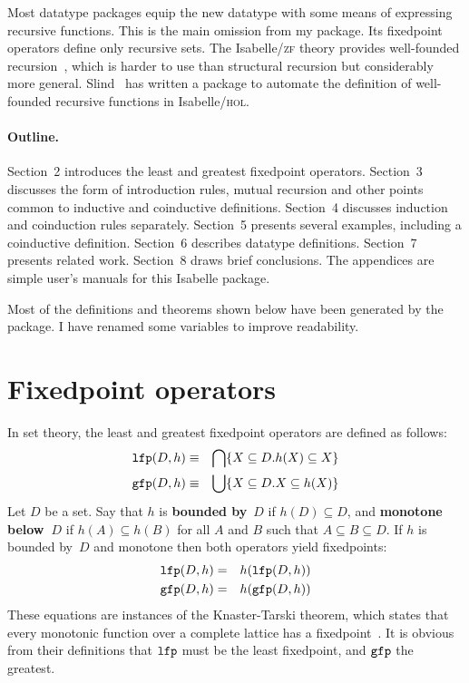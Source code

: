 \documentclass[12pt,a4paper]{article}
\newif\ifshort%
\newcommand\sbs{\subseteq}
\newcommand\defn[1]{{\bf#1}}
\newcommand\lfp{\hbox{\tt lfp}}
\newcommand\gfp{\hbox{\tt gfp}}
\begin{document}
Most datatype packages equip the new datatype with some means of expressing
recursive functions.  This is the main omission from my package.  Its
fixedpoint operators define only recursive sets.  The Isabelle/\textsc{zf}
theory provides well-founded recursion~\cite{paulson-set-II}, which is harder
to use than structural recursion but considerably more general.
Slind~\cite{slind-tfl} has written a package to automate the definition of
well-founded recursive functions in Isabelle/\textsc{hol}.

\paragraph*{Outline.} Section~2 introduces the least and greatest fixedpoint
operators.  Section~3 discusses the form of introduction rules, mutual
recursion and other points common to inductive and coinductive definitions.
Section~4 discusses induction and coinduction rules separately.  Section~5
presents several examples, including a coinductive definition.  Section~6
describes datatype definitions.  Section~7 presents related work.
Section~8 draws brief conclusions.  \ifshort\else The appendices are simple
user's manuals for this Isabelle package.\fi

Most of the definitions and theorems shown below have been generated by the
package.  I have renamed some variables to improve readability.
 
\section{Fixedpoint operators}
In set theory, the least and greatest fixedpoint operators are defined as
follows:
\begin{eqnarray*}
   \lfp(D,h)  & \equiv & \inter\{X\sbs D. h(X)\sbs X\} \\
   \gfp(D,h)  & \equiv & \union\{X\sbs D. X\sbs h(X)\}
\end{eqnarray*}   
Let $D$ be a set.  Say that $h$ is \defn{bounded by}~$D$ if $h(D)\sbs D$, and
\defn{monotone below~$D$} if
$h(A)\sbs h(B)$ for all $A$ and $B$ such that $A\sbs B\sbs D$.  If $h$ is
bounded by~$D$ and monotone then both operators yield fixedpoints:
\begin{eqnarray*}
   \lfp(D,h)  & = & h(\lfp(D,h)) \\
   \gfp(D,h)  & = & h(\gfp(D,h)) 
\end{eqnarray*}   
These equations are instances of the Knaster-Tarski theorem, which states
that every monotonic function over a complete lattice has a
fixedpoint~\cite{davey-priestley}.  It is obvious from their definitions
that $\lfp$ must be the least fixedpoint, and $\gfp$ the greatest.
\end{document}
